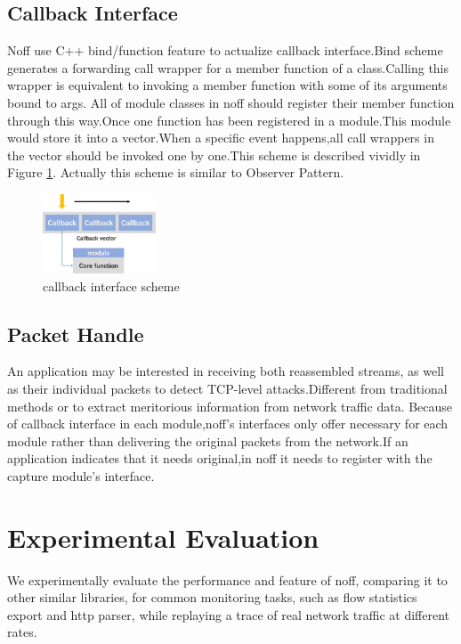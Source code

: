 \documentclass[conference]{IEEEtran}
\begin{document}
\subsection{Callback Interface}
Noff use C++ bind/function feature to actualize callback interface.Bind scheme generates a forwarding call wrapper for a member function of a class.Calling this wrapper is equivalent to invoking a member function with some of its arguments bound to args. 
All of module classes in noff should register their member function through this way.Once one function has been registered in a module.This module would store it into a vector.When a specific event happens,all call wrappers in the vector should be invoked one by one.This scheme is described vividly in Figure \ref{fig:6}.
\newline\indent Actually this scheme is similar to Observer Pattern.
\begin{figure}[htbp]
  \centering
  \includegraphics[width=0.3\textwidth]{./picture/Figure5.jpg}
  \caption{callback interface scheme}
  \label{fig:6}
\end{figure}
\subsection{Packet Handle}
An application may be interested in receiving both reassembled streams, as well as their individual packets to detect TCP-level attacks.Different from traditional methods or to extract meritorious information from network traffic data. Because of callback interface in each module,noff's interfaces only offer necessary for each module rather than delivering the original packets from the network.If an application indicates that it needs original,in noff it needs to register with the capture module's interface.

\section{Experimental Evaluation}
We experimentally evaluate the performance and feature of noff, comparing it to other similar libraries, for common monitoring tasks, such as flow statistics export and http parser, while replaying a trace of real network traffic at different rates.
\end{document}
